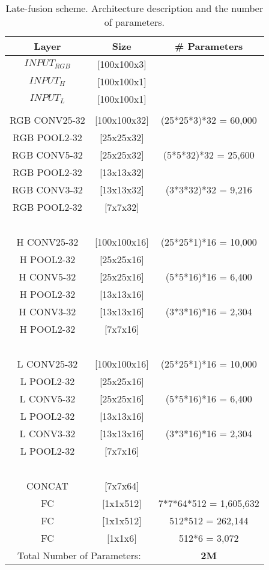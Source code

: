 \documentclass[review,12pt,3p]{elsarticle}
\begin{document}
\begin{table}[!ht]
\centering
\scriptsize
\begin{tabular}{  c  c |  c} 

      Layer &    Size      & \# Parameters \\
               \hline
$INPUT_{RGB}$ &    [100x100x3]& \\
$INPUT_H$   &   [100x100x1]& \\
$INPUT_L$   &   [100x100x1]& \\
  		&      \\
RGB CONV25-32& [100x100x32] 		&   (25*25*3)*32 	  =      60,000\\
RGB POOL2-32&  [25x25x32] 	& \\
RGB CONV5-32&  [25x25x32] 		&   (5*5*32)*32 	  =      25,600\\
RGB POOL2-32&  [13x13x32] 	& \\
RGB CONV3-32&  [13x13x32] 		&   (3*3*32)*32 	  =       9,216\\
RGB POOL2-32&  [7x7x32] 		&   \\
&~ & \\
H CONV25-32& [100x100x16] 		&   (25*25*1)*16 	  =      10,000\\
H POOL2-32&  [25x25x16] 	& \\
H CONV5-32&  [25x25x16] 		&   (5*5*16)*16 	  =       6,400\\
H POOL2-32&  [13x13x16] 	& \\
H CONV3-32&  [13x13x16] 		&   (3*3*16)*16 	  =       2,304\\
H POOL2-32&  [7x7x16] 		&   \\
&~ & \\
L CONV25-32& [100x100x16] 		&   (25*25*1)*16 	  =      10,000\\
L POOL2-32&  [25x25x16] 	& \\
L CONV5-32&  [25x25x16] 		&   (5*5*16)*16 	  =       6,400\\
L POOL2-32&  [13x13x16] 	& \\
L CONV3-32&  [13x13x16] 		&   (3*3*16)*16 	  =       2,304\\
L POOL2-32&  [7x7x16] 		&   \\ 
& ~ & \\
CONCAT      & [7x7x64]  & \\
FC&         [1x1x512] 			&   7*7*64*512   	  =    1,605,632\\
FC&         [1x1x512] 			&   512*512 	          =      262,144\\
FC&         [1x1x6]			&   512*6 	  	  =        3,072\\   
\hline

\multicolumn{2}{c}{ Total Number of Parameters:} & \textbf{2M} \\

\end{tabular}

\caption{Late-fusion scheme. Architecture description and the number of parameters.}
\label{tab:lateStyle}
\end{table}
\end{document}
